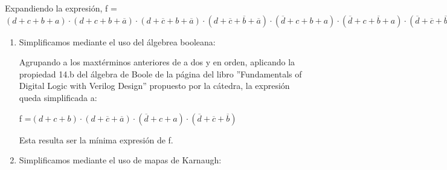 \documentclass[../../informe/src/main.tex]{subfiles}
\begin{document}
	Expandiendo la expresión, f =$ (d+c+b+a)\cdot (d+c+b+\overline{a})\cdot (d+\overline{c}+b+\overline{a})
	\cdot (d+\overline{c}+\overline{b}+\overline{a})\cdot (\overline{d}+c+b+a)\cdot
	 (\overline{d}+c+\overline{b}+a)\cdot (\overline{d}+\overline{c}+\overline{b}+a)\cdot
	 (\overline{d}+\overline{c}+\overline{b}+\overline{a})$
	 \par
	 \begin{enumerate}
	 	\item Simplificamos mediante el uso del álgebrea booleana: \par
	 	
	 		Agrupando a los maxtérminos anteriores de a dos y en orden, aplicando la propiedad 14.b del álgebra de Boole de la página del 				libro ''Fundamentals of Digital Logic with Verilog Design'' propuesto por la cátedra, la expresión queda simplificada a: \par
	 		f =$ (d+c+b)\cdot (d+\overline{c}+\overline{a})\cdot (\overline{d}+c+a)\cdot (\overline{d}+\overline{c}+\overline{b})$\par
			
			Esta resulta ser la mínima expresión de f. \par

			
		\item Simplificamos mediante el uso de mapas de Karnaugh: \par


\end{enumerate}
\end{document}
